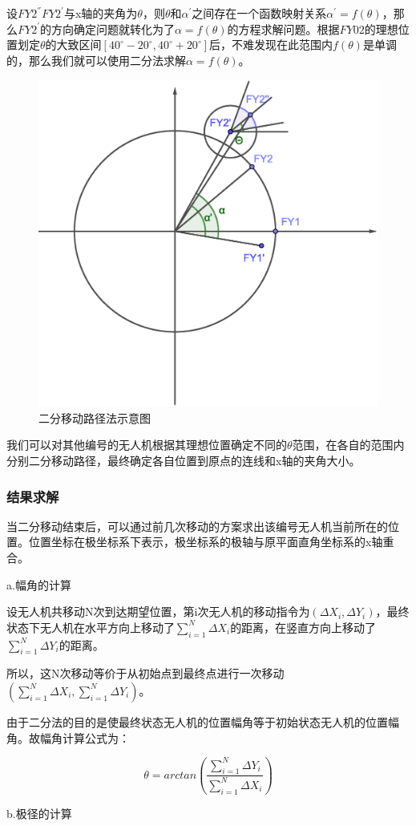 \documentclass{ctexart}
\begin{document}
  设$FY2^{''}FY2^{'}$与x轴的夹角为$\theta$，则$\theta$和$\alpha^{'}$之间存在一个函数映射关系$\alpha^{'}=f(\theta)$，那么$FY2^{'}$的方向确定问题就转化为了$\alpha=f(\theta)$的方程求解问题。根据$FY02$的理想位置划定$\theta$的大致区间$[40^{\circ}-20^{\circ},40^{\circ}+20^{\circ}]$后，不难发现在此范围内$f(\theta)$是单调的，那么我们就可以使用二分法求解$\alpha=f(\theta)$。

  \begin{figure}[H]
    \centering
    \includegraphics[width=0.40\linewidth]{pic/bisection.eps}
    \caption{二分移动路径法示意图}
    \label{二分移动路径法示意图}
    \end{figure}


    我们可以对其他编号的无人机根据其理想位置确定不同的$\theta$范围，在各自的范围内分别二分移动路径，最终确定各自位置到原点的连线和x轴的夹角大小。
\subsubsection{结果求解}

当二分移动结束后，可以通过前几次移动的方案求出该编号无人机当前所在的位置。位置坐标在极坐标系下表示，极坐标系的极轴与原平面直角坐标系的x轴重合。

a.幅角的计算

设无人机共移动N次到达期望位置，第i次无人机的移动指令为$(\Delta X_i,\Delta Y_i)$，最终状态下无人机在水平方向上移动了$\sum_{i=1}^{N}\Delta X_i$的距离，在竖直方向上移动了$\sum_{i=1}^{N}\Delta Y_i$的距离。

所以，这N次移动等价于从初始点到最终点进行一次移动$(\sum_{i=1}^{N}\Delta X_i,\sum_{i=1}^{N}\Delta Y_i)$。

由于二分法的目的是使最终状态无人机的位置幅角等于初始状态无人机的位置幅角。故幅角计算公式为：

\begin{equation}
  \theta=arctan(\frac{\sum_{i=1}^{N}\Delta Y_i}{\sum_{i=1}^{N}\Delta X_i})
\end{equation}

b.极径的计算
\end{document}
